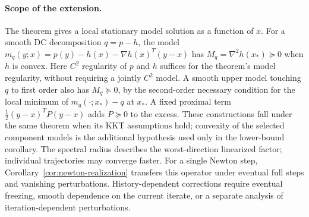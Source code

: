 \documentclass[pdflatex,sn-mathphys-num]{sn-jnl}
\theoremstyle{thmstyleone}
\theoremstyle{thmstylethree}
\begin{document}
\paragraph{Scope of the extension.}
The theorem gives a local stationary model solution as a function of $x$.
For a smooth DC decomposition $q=p-h$, the model
$m_q(y;x)=p(y)-h(x)-\nabla h(x)^T(y-x)$ has
$M_q=\nabla^2h(x_*)\succeq0$ when $h$ is convex. Here $C^2$ regularity
of $p$ and $h$ suffices for the theorem's model regularity, without
requiring a jointly $C^2$ model. A smooth upper model touching $q$
to first order also has $M_q\succeq0$, by the second-order necessary
condition for the local minimum of $m_q(\cdot;x_*)-q$ at $x_*$.
A fixed proximal term $\tfrac12(y-x)^TP(y-x)$ adds $P\succeq0$ to
the excess. These constructions fall under the same theorem when
its KKT assumptions hold; convexity of the selected component models is
the additional hypothesis used only in the lower-bound corollary.
The spectral radius describes the worst-direction linearized factor;
individual trajectories may converge faster. For a single Newton step,
Corollary~\ref{cor:newton-realization} transfers this operator under
eventual full steps and vanishing perturbations. History-dependent
corrections require eventual freezing, smooth dependence on the current iterate,
or a separate analysis of iteration-dependent perturbations.
\end{document}
